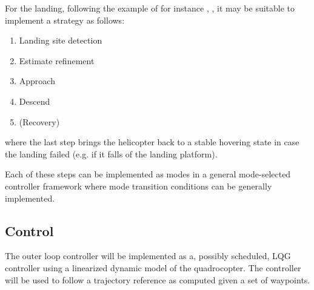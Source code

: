         For the landing, following the example of for instance \cite{brockers:803111}, \cite{DM:MS:10}, it
        may be suitable to implement a strategy as follows:
        \begin{enumerate}
            \item Landing site detection
            \item Estimate refinement
            \item Approach
            \item Descend
            \item (Recovery)
        \end{enumerate}
        where the last step brings the helicopter back to a stable hovering state
        in case the landing failed (e.g. if it falls of the landing platform).

        Each of these steps can be implemented as modes in a general
        mode-selected controller framework where mode transition conditions
        can be generally implemented.

    \subsection{Control}
        The outer loop controller will be implemented as a, possibly scheduled,
        LQG controller using a linearized dynamic model of the quadrocopter.
        The controller will be used to follow a trajectory reference as computed
        given a set of waypoints.
